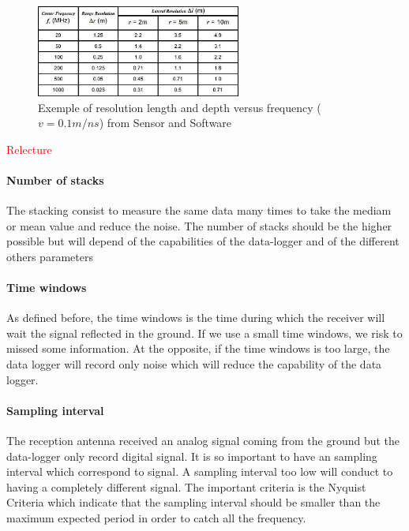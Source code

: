 \begin{figure}[h]
    \centering
    \includegraphics[width=0.6\textwidth]{Images/00_Theory/SS_FrequencyDepthResolution.jpg}
    \caption{Exemple of resolution length and depth versus frequency ($v=0.1m/ns$) from Sensor and Software \cite{UnderstandingDetection}}
    \label{fig:GPRFrequency}
\end{figure}

\textcolor{red}{Relecture}

\paragraph{Number of stacks} The stacking consist to measure the same data many times to take the mediam or mean value and reduce the noise. The number of stacks should be the higher possible but will depend of the capabilities of the data-logger and of the different others parameters

\paragraph{Time windows} As defined before, the time windows is the time during which the receiver will wait the signal reflected in the ground. If we use a small time windows, we risk to missed some information. At the opposite, if the time windows is too large, the data logger will record only noise which will reduce the capability of the data logger.

\paragraph{Sampling interval} The reception antenna received an analog signal coming from the ground but the data-logger only record digital signal. It is so important to have an sampling interval which correspond to signal. A sampling interval too low will conduct to having a completely different signal. The important criteria is the Nyquist Criteria which indicate that the sampling interval should be smaller than the maximum expected period in order to catch all the frequency. 

